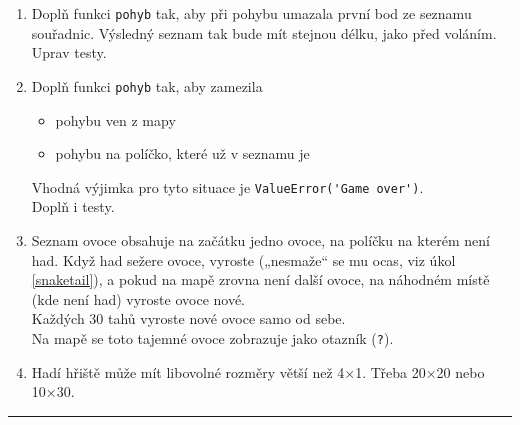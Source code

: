 \documentclass[a4paper,10pt]{article}
\begin{document}
\begin{enumerate}[resume]
\item \label{snaketail}
    Doplň funkci \verb+pohyb+ tak, aby při pohybu umazala první bod ze seznamu
    souřadnic. Výsledný seznam tak bude mít stejnou délku, jako před voláním.
    \\Uprav testy.

\item Doplň funkci \verb+pohyb+ tak, aby zamezila
    \begin{itemize}
    \item pohybu ven z mapy
    \item pohybu na políčko, které už v seznamu je
    \end{itemize}
    Vhodná výjimka pro tyto situace je \verb+ValueError('Game over')+.
    \\Doplň i testy.

\item Seznam ovoce obsahuje na začátku jedno ovoce, na políčku na kterém není had.
    Když had sežere ovoce, vyroste („nesmaže“ se mu ocas, viz úkol \ref{snaketail}),
    a pokud na mapě zrovna není další ovoce, na náhodném místě (kde není had) vyroste ovoce nové.
    \\Každých 30 tahů vyroste nové ovoce samo od sebe.
    \\Na mapě se toto tajemné ovoce zobrazuje jako otazník (\verb+?+).

\item \label{snakeend}
    Hadí hřiště může mít libovolné rozměry větší než 4×1.
    Třeba 20×20 nebo 10×30.

\end{enumerate}

\hrule
\end{document}
